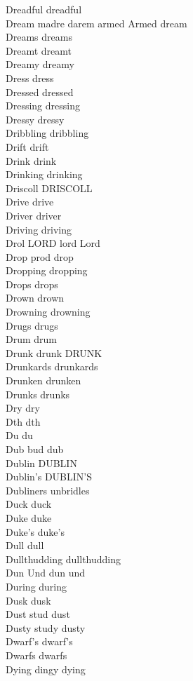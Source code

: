 Dreadful dreadful\\
Dream madre darem armed Armed dream\\
Dreams dreams\\
Dreamt dreamt\\
Dreamy dreamy\\
Dress dress\\
Dressed dressed\\
Dressing dressing\\
Dressy dressy\\
Dribbling dribbling\\
Drift drift\\
Drink drink\\
Drinking drinking\\
Driscoll DRISCOLL\\
Drive drive\\
Driver driver\\
Driving driving\\
Drol LORD lord Lord\\
Drop prod drop\\
Dropping dropping\\
Drops drops\\
Drown drown\\
Drowning drowning\\
Drugs drugs\\
Drum drum\\
Drunk drunk DRUNK\\
Drunkards drunkards\\
Drunken drunken\\
Drunks drunks\\
Dry dry\\
Dth dth\\
Du du\\
Dub bud dub\\
Dublin DUBLIN\\
Dublin's DUBLIN'S\\
Dubliners unbridles\\
Duck duck\\
Duke duke\\
Duke's duke's\\
Dull dull\\
Dullthudding dullthudding\\
Dun Und dun und\\
During during\\
Dusk dusk\\
Dust stud dust\\
Dusty study dusty\\
Dwarf's dwarf's\\
Dwarfs dwarfs\\
Dying dingy dying\\

